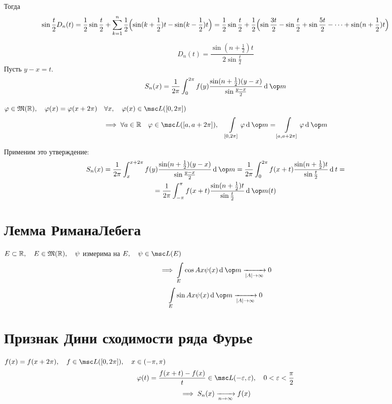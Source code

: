 Тогда
$$ \sin \frac t2 D_n(t) = \frac 12 \sin \frac t2 + \sum_{k = 1}^n \frac12 \Bigl( \sin (k + \frac12) t - \sin (k - \frac12) t \Bigr) =
\frac12 \sin \frac t2 + \frac12 \Bigl( \sin \frac{3t}2 - \sin \frac t 2 + \sin \frac{5t}2 - \dots + \sin (n + \frac12)t \Bigr) $$

$$ D_n(t) = \frac{\sin(n + \frac12)t}{2 \sin \frac t2} $$
Пусть $ y - x = t $.
$$ S_n(x) = \frac1{2\pi} \int_0^{2\pi} f(y) \frac{\sin (n + \frac12)(y - x)}{\sin \frac{y - x}2} \di \op m $$

\begin{statement}
	$ \phi \in \mathfrak M(\R), \quad \phi(x) = \phi(x + 2\pi) \quad \forall x, \quad \phi(x) \in \msc L([0, 2\pi]) $
	$$ \implies \forall a \in \R \quad \phi \in \msc L([a, a + 2\pi]), \quad \int\limits_{[0, 2\pi]} \phi \di \op m = \int\limits_{[a, a + 2\pi]} \phi \di \op m $$
\end{statement}

Применим это утверждение:
\begin{multline*}
	S_n(x) = \frac1{2\pi} \int_x^{x + 2\pi} f(y) \frac{\sin (n + \frac12)(y - x)}{\sin \frac{y - x}2} \di \op m = \frac1{2\pi} \int_0^{2\pi} f(x + t) \frac{\sin(n + \frac12)t}{\sin \frac t2} \di t = \\
	= \frac1{2\pi} \int_{-\pi}^\pi f(x + t) \frac{\sin(n + \frac12)t}{\sin \frac t2} \di \op m(t)
\end{multline*}

\section{Лемма РиманаЛебега}

\begin{lemma}
	$ E \subset \mathbb{R}, \quad E \in \mathfrak M(\mathbb{R}), \quad \psi $ измерима на $ E, \quad \psi \in \msc L(E) $
	$$ \implies \int\limits_E \cos A x \psi(x) \di \op m \underarr{|A| \to \infty} 0 $$
	$$ \int\limits_E \sin A x \psi(x) \di \op m \underarr{|A| \to \infty} 0 $$
\end{lemma}

\section{Признак Дини сходимости ряда Фурье}

\begin{theorem}
	$ f(x) = f(x + 2\pi), \quad f \in \msc L([0, 2\pi]), \quad x \in (-\pi, \pi) $
	$$ \phi(t) = \frac{f(x + t) - f(x)}t \in \msc L(-\eps, \eps), \quad 0 < \eps < \frac \pi 2 $$
	$$ \implies S_n(x) \xrightarrow[n \to \infty]{} f(x) $$
\end{theorem}

